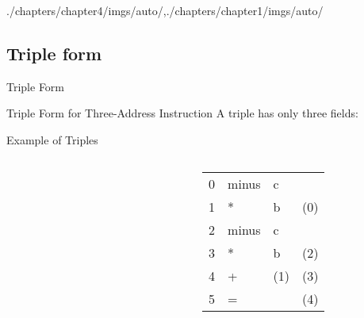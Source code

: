 \begin{graphicspathcontext}{{./chapters/chapter4/imgs/auto/},{./chapters/chapter1/imgs/auto/}}
\begin{bibunit}[apalike]
\subsection{Triple form}
\subsectiontableofcontentslide

\begin{frame}{Triple Form}
	\vspace{.25cm}
	\begin{definitionblock}{Triple Form for Three-Address Instruction}
		A triple has only three fields:
		\begin{center}
		\end{center}
	\end{definitionblock}
	\vspace{.25cm}
\end{frame}

\begin{frame}[background=8]{Example of Triples}
	\begin{columns}
		\begin{column}{.45\linewidth}
			\begin{tac}[\linewidth]
			\end{tac}
		\end{column}
		\begin{column}{.1\linewidth}
		\end{column}
		\begin{column}{.45\linewidth}
			\begin{tabularx}{\linewidth}{|c|X|X|X|}
			\hline
			\tabularheading&\chead{op}&\chead{arg$_1$}&\chead{arg$_2$}\\
			\hline
			0 & minus & c & \\
			\hline
			1 & * & b & (0) \\
			\hline
			2 & minus & c & \\
			\hline
			3 & * & b & (2) \\
			\hline
			4 & + & (1) & (3) \\
			\hline
			5 & = & \tactext{a} & (4) \\
			\hline
			\end{tabularx}
		\end{column}
	\end{columns}
\end{frame}


\end{bibunit}
\end{graphicspathcontext}
